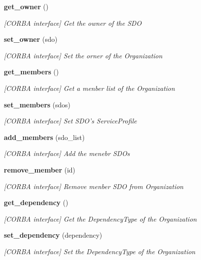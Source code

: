 \begin{CompactItemize}
{\bf get\_\-owner} ()
\begin{CompactList}\small\item\em [CORBA interface] Get the owner of the SDO \item\end{CompactList}\item 
{\bf set\_\-owner} (sdo)
\begin{CompactList}\small\item\em [CORBA interface] Set the orner of the Organization \item\end{CompactList}\item 
{\bf get\_\-members} ()
\begin{CompactList}\small\item\em [CORBA interface] Get a menber list of the Organization \item\end{CompactList}\item 
{\bf set\_\-members} (sdos)
\begin{CompactList}\small\item\em [CORBA interface] Set SDO's Service\-Profile \item\end{CompactList}\item 
{\bf add\_\-members} (sdo\_\-list)
\begin{CompactList}\small\item\em [CORBA interface] Add the menebr SDOs \item\end{CompactList}\item 
{\bf remove\_\-member} (id)
\begin{CompactList}\small\item\em [CORBA interface] Remove menber SDO from Organization \item\end{CompactList}\item 
{\bf get\_\-dependency} ()
\begin{CompactList}\small\item\em [CORBA interface] Get the Dependency\-Type of the Organization \item\end{CompactList}\item 
{\bf set\_\-dependency} (dependency)
\begin{CompactList}\small\item\em [CORBA interface] Set the Dependency\-Type of the Organization \item\end{CompactList}\end{CompactItemize}
